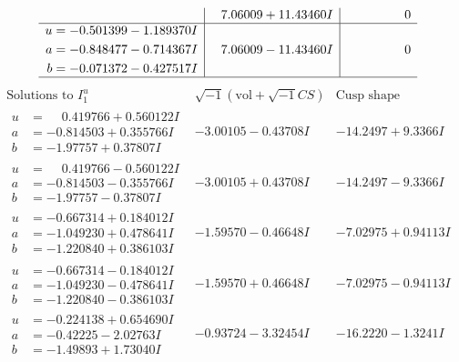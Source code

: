\documentclass[1p]{elsarticle_modified}
\theoremstyle{definition}
\newcommand{\I}{\sqrt{-1}}
\begin{document}
$$\begin{array}{c|c|c}
 & \phantom{-}7.06009 + 11.43460 I & \phantom{-0.000000 } 0 \\ \hline\begin{aligned}
u &= -0.501399 - 1.189370 I \\
a &= -0.848477 - 0.714367 I \\
b &= -0.071372 - 0.427517 I\end{aligned}
 & \phantom{-}7.06009 - 11.43460 I & \phantom{-0.000000 } 0\\
 \hline 
 \end{array}$$\newpage$$\begin{array}{c|c|c}  
\text{Solutions to }I^u_{1}& \I (\text{vol} + \sqrt{-1}CS) & \text{Cusp shape}\\
 \hline 
\begin{aligned}
u &= \phantom{-}0.419766 + 0.560122 I \\
a &= -0.814503 + 0.355766 I \\
b &= -1.97757 + 0.37807 I\end{aligned}
 & -3.00105 - 0.43708 I & -14.2497 + 9.3366 I \\ \hline\begin{aligned}
u &= \phantom{-}0.419766 - 0.560122 I \\
a &= -0.814503 - 0.355766 I \\
b &= -1.97757 - 0.37807 I\end{aligned}
 & -3.00105 + 0.43708 I & -14.2497 - 9.3366 I \\ \hline\begin{aligned}
u &= -0.667314 + 0.184012 I \\
a &= -1.049230 + 0.478641 I \\
b &= -1.220840 + 0.386103 I\end{aligned}
 & -1.59570 - 0.46648 I & -7.02975 + 0.94113 I \\ \hline\begin{aligned}
u &= -0.667314 - 0.184012 I \\
a &= -1.049230 - 0.478641 I \\
b &= -1.220840 - 0.386103 I\end{aligned}
 & -1.59570 + 0.46648 I & -7.02975 - 0.94113 I \\ \hline\begin{aligned}
u &= -0.224138 + 0.654690 I \\
a &= -0.42225 - 2.02763 I \\
b &= -1.49893 + 1.73040 I\end{aligned}
 & -0.93724 - 3.32454 I & -16.2220 - 1.3241 I \\ \hline\begin{aligned}

\end{aligned}
\end{array}$$
\end{document}
